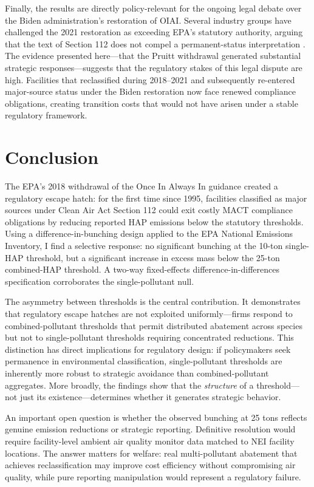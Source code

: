 \documentclass[12pt]{article}
\begin{document}
Finally, the results are directly policy-relevant for the ongoing legal debate over the Biden administration's restoration of OIAI. Several industry groups have challenged the 2021 restoration as exceeding EPA's statutory authority, arguing that the text of Section 112 does not compel a permanent-status interpretation \citep{ELI2019}. The evidence presented here---that the Pruitt withdrawal generated substantial strategic responses---suggests that the regulatory stakes of this legal dispute are high. Facilities that reclassified during 2018--2021 and subsequently re-entered major-source status under the Biden restoration now face renewed compliance obligations, creating transition costs that would not have arisen under a stable regulatory framework.

\section{Conclusion}

The EPA's 2018 withdrawal of the Once In Always In guidance created a regulatory escape hatch: for the first time since 1995, facilities classified as major sources under Clean Air Act Section 112 could exit costly MACT compliance obligations by reducing reported HAP emissions below the statutory thresholds. Using a difference-in-bunching design applied to the EPA National Emissions Inventory, I find a selective response: no significant bunching at the 10-ton single-HAP threshold, but a significant increase in excess mass below the 25-ton combined-HAP threshold. A two-way fixed-effects difference-in-differences specification corroborates the single-pollutant null.

The asymmetry between thresholds is the central contribution. It demonstrates that regulatory escape hatches are not exploited uniformly---firms respond to combined-pollutant thresholds that permit distributed abatement across species but not to single-pollutant thresholds requiring concentrated reductions. This distinction has direct implications for regulatory design: if policymakers seek permanence in environmental classification, single-pollutant thresholds are inherently more robust to strategic avoidance than combined-pollutant aggregates. More broadly, the findings show that the \emph{structure} of a threshold---not just its existence---determines whether it generates strategic behavior.

An important open question is whether the observed bunching at 25 tons reflects genuine emission reductions or strategic reporting. Definitive resolution would require facility-level ambient air quality monitor data matched to NEI facility locations. The answer matters for welfare: real multi-pollutant abatement that achieves reclassification may improve cost efficiency without compromising air quality, while pure reporting manipulation would represent a regulatory failure.
\end{document}
